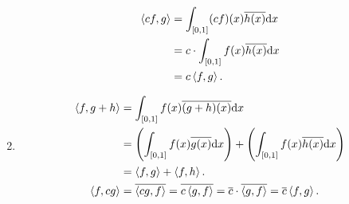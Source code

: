 \documentclass{article}
\begin{document}
\begin{enumerate}[label=(\alph*)]
\begin{align*}
        \left\langle cf,g \right\rangle &= \int_{[0,1]} (cf)(x) \overline{h(x)} \mathrm{d} x \\
                    &= c \cdot \int_{[0,1]} f(x) \overline{h(x)} \mathrm{d} x \\
                    &= c \left\langle f,g \right\rangle.
\end{align*}
\item \begin{align*}
        \left\langle f,g+h \right\rangle &= \int_{[0,1]} f(x) \overline{(g+h)(x)} \mathrm{d} x \\
                     &= \left( \int_{[0,1]} f(x) \overline{g(x)} \mathrm{d} x \right) + \left( \int_{[0,1]} f(x) \overline{h(x)} \mathrm{d} x \right) \\
                     &= \left\langle f,g \right\rangle + \left\langle f,h \right\rangle. \\
        \left\langle f,cg \right\rangle &= \overline{\left\langle cg,f \right\rangle} = \overline{c\left\langle g,f \right\rangle} = \overline{c} \cdot \overline{\left\langle g,f \right\rangle} = \overline{c} \left\langle f,g \right\rangle.
\end{align*}
\end{enumerate}
\end{document}
